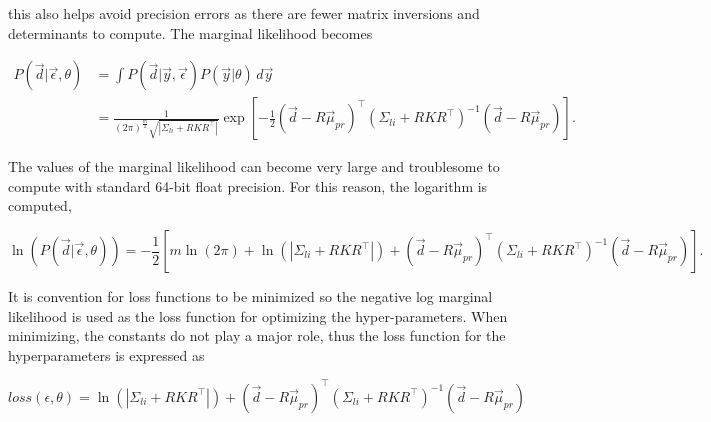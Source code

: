 this also helps avoid precision errors as there are fewer matrix inversions and determinants to compute. The marginal likelihood becomes

\begin{equation}
\begin{aligned}
 P(\vec d|\vec\epsilon,\theta) &= \int P(\vec{d}|\vec{y},\vec\epsilon)P(\vec{y}|\theta)  \, d\vec y \\
 &= \frac{1}{(2\pi)^{\frac{m}{2}} \sqrt{|\Sigma_{li} + RKR^\top|}} \exp\left[ -\frac{1}{2} (\vec{d} - R\vec{\mu}_{pr})^{\top} (\Sigma_{li} + R K R^{\top})^{-1} (\vec{d} - R\vec{\mu}_{pr}) \right].
\end{aligned}
\end{equation}

The values of the marginal likelihood can become very large and troublesome to compute with standard 64-bit float precision. For this reason, the logarithm is computed,

\begin{equation}
\ln(P(\vec d| \vec \epsilon,\theta)) = -\frac{1}{2} \left[m\ln(2\pi ) + \ln(|\Sigma_{li}+RKR^\top|) +  (\vec{d} - R\vec{\mu}_{pr})^{\top} (\Sigma_{li} + R K R^{\top})^{-1} (\vec{d} - R\vec{\mu}_{pr})\right]. 
\end{equation}

It is convention for loss functions to be minimized so the negative log marginal likelihood is used as the loss function for optimizing the hyper-parameters. When minimizing, the constants do not play a major role, thus the loss function for the hyperparameters is expressed as

\begin{equation}
loss(\epsilon, \theta) = \ln(|\Sigma_{li}+RKR^\top|) +  (\vec{d} - R\vec{\mu}_{pr})^{\top} (\Sigma_{li} + R K R^{\top})^{-1} (\vec{d} - R\vec{\mu}_{pr})
\end{equation}
